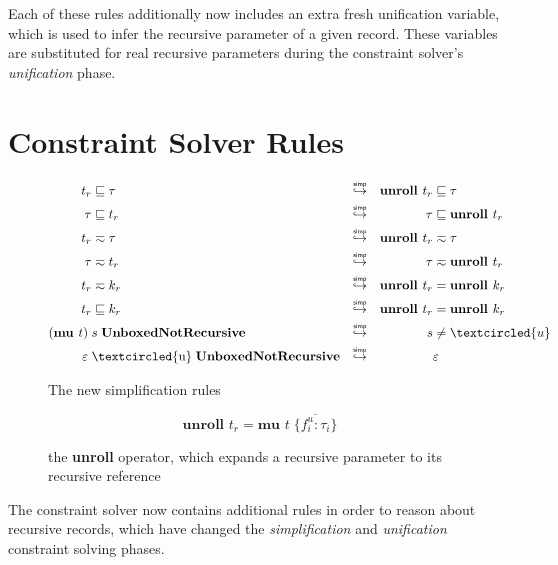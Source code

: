 Each of these rules additionally now includes an extra fresh unification variable, which is
used to infer the recursive parameter of a given record. These variables are substituted
for real recursive parameters during the constraint solver's \textit{unification} phase.

\section{Constraint Solver Rules}

\begin{figure}
    \centering
    \begin{align}
       t_r  &\subtype \tau  & \simp  && \textbf{unroll } t_r  &\subtype  \tau \label{eq:firsteq} \\
       \tau &\subtype t_r   & \simp  && \tau                  &\subtype  \textbf{unroll } t_r \\
       t_r  &\typeeq  \tau  & \simp  && \textbf{unroll } t_r  &\typeeq   \tau \\
       \tau &\typeeq  t_r   & \simp  && \tau                  &\typeeq   \textbf{unroll } t_r \label{eq:lasteq} \\
       t_r  &\typeeq  k_r   & \simp  && \textbf{unroll } t_r  &=         \textbf{unroll } k_r \label{eq:firstrecs} \\
       t_r  &\subtype k_r   & \simp  && \textbf{unroll } t_r  &=         \textbf{unroll } k_r \label{eq:lastrecs} \\
       (\textbf{mu } t)\; &s\; \textbf{UnboxedNotRecursive}   
            & \simp &&  s &\neq \textcircled{u} \label{eq:firstunbox} \\
       \varepsilon\; &\text{\textcircled{u}}\; \textbf{UnboxedNotRecursive} 
            & \simp &&  &\varepsilon \label{eq:lastunbox}
    \end{align}
    \caption{The new simplification rules}
    \label{fig:simprules}
\end{figure}

\begin{figure}
    \centering
    \[
        \textbf{unroll } t_r = \textbf{mu } t\; \{ \overline{f_i^u : \tau_i} \} 
    \]
    \caption{the \textbf{unroll} operator, which expands a recursive parameter
             to its recursive reference}
    \label{fig:unrolldef}
\end{figure}

The constraint solver now contains additional rules in order to reason about recursive
records, which have changed the \textit{simplification} and \textit{unification}
constraint solving phases.

